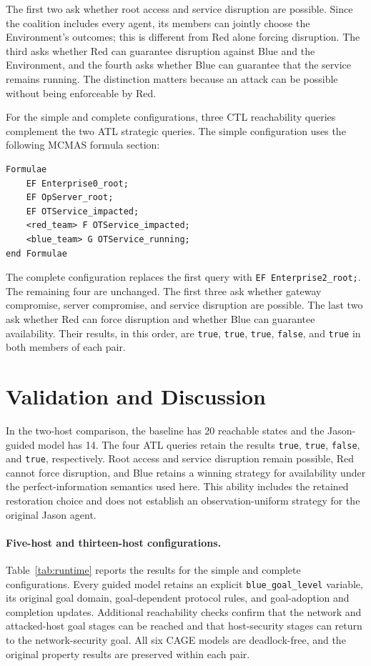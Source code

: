 \documentclass[runningheads]{llncs}
\begin{document}
The first two ask whether root access and service disruption are possible. Since the coalition includes every agent, its members can jointly choose the Environment's outcomes; this is different from Red alone forcing disruption. The third asks whether Red can guarantee disruption against Blue and the Environment, and the fourth asks whether Blue can guarantee that the service remains running. The distinction matters because an attack can be possible without being enforceable by Red.

For the simple and complete configurations, three CTL reachability
queries complement the two ATL strategic queries. The simple
configuration uses the following MCMAS formula section:

\begin{verbatim}
Formulae
    EF Enterprise0_root;
    EF OpServer_root;
    EF OTService_impacted;
    <red_team> F OTService_impacted;
    <blue_team> G OTService_running;
end Formulae
\end{verbatim}

The complete configuration replaces the first query with
\texttt{EF Enterprise2\_root;}. The remaining four are unchanged.
The first three ask whether gateway compromise, server compromise,
and service disruption are possible. The last two ask whether Red
can force disruption and whether Blue can guarantee availability.
Their results, in this order, are \texttt{true}, \texttt{true},
\texttt{true}, \texttt{false}, and \texttt{true} in both members
of each pair.

\section{Validation and Discussion}

In the two-host comparison, the baseline has 20 reachable states and
the Jason-guided model has 14. The four ATL queries retain the results
\texttt{true}, \texttt{true}, \texttt{false}, and \texttt{true},
respectively. Root access and service disruption remain possible,
Red cannot force disruption, and Blue retains a winning strategy for
availability under the perfect-information semantics used here.
This ability includes the retained restoration choice and does not
establish an observation-uniform strategy for the original Jason agent.

\paragraph{Five-host and thirteen-host configurations.}
Table~\ref{tab:runtime} reports the results for the simple and complete
configurations. Every guided model retains an explicit
\texttt{blue\_goal\_level} variable, its original goal domain,
goal-dependent protocol rules, and goal-adoption and completion updates.
Additional reachability checks confirm that the network and attacked-host
goal stages can be reached and that host-security stages can return to
the network-security goal. All six CAGE models are deadlock-free,
and the original property results are preserved within each pair.
\end{document}

